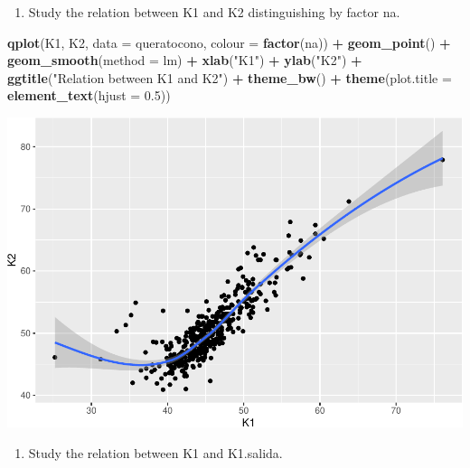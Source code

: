 \documentclass[
]{article}
\newenvironment{Shaded}{\begin{snugshade}}{\end{snugshade}}
\newcommand{\DataTypeTok}[1]{\textcolor[rgb]{0.13,0.29,0.53}{#1}}
\newcommand{\FloatTok}[1]{\textcolor[rgb]{0.00,0.00,0.81}{#1}}
\newcommand{\KeywordTok}[1]{\textcolor[rgb]{0.13,0.29,0.53}{\textbf{#1}}}
\newcommand{\NormalTok}[1]{#1}
\newcommand{\OperatorTok}[1]{\textcolor[rgb]{0.81,0.36,0.00}{\textbf{#1}}}
\newcommand{\StringTok}[1]{\textcolor[rgb]{0.31,0.60,0.02}{#1}}
\providecommand{\tightlist}{%
  \setlength{\itemsep}{0pt}\setlength{\parskip}{0pt}}
\begin{document}
\begin{enumerate}
\def\labelenumi{\arabic{enumi}.}
\setcounter{enumi}{1}
\tightlist
\item
  Study the relation between K1 and K2 distinguishing by factor na.
\end{enumerate}

\begin{Shaded}
\begin{Highlighting}[]
\KeywordTok{qplot}\NormalTok{(K1, K2, }\DataTypeTok{data =}\NormalTok{ queratocono, }\DataTypeTok{colour =} \KeywordTok{factor}\NormalTok{(na)) }\OperatorTok{+}
\StringTok{  }\KeywordTok{geom_point}\NormalTok{() }\OperatorTok{+}
\StringTok{  }\KeywordTok{geom_smooth}\NormalTok{(}\DataTypeTok{method =}\NormalTok{ lm) }\OperatorTok{+}
\StringTok{  }\KeywordTok{xlab}\NormalTok{(}\StringTok{"K1"}\NormalTok{) }\OperatorTok{+}\StringTok{ }\KeywordTok{ylab}\NormalTok{(}\StringTok{"K2"}\NormalTok{) }\OperatorTok{+}
\StringTok{  }\KeywordTok{ggtitle}\NormalTok{(}\StringTok{"Relation between K1 and K2"}\NormalTok{) }\OperatorTok{+}
\StringTok{  }\KeywordTok{theme_bw}\NormalTok{() }\OperatorTok{+}
\StringTok{  }\KeywordTok{theme}\NormalTok{(}\DataTypeTok{plot.title =} \KeywordTok{element_text}\NormalTok{(}\DataTypeTok{hjust =} \FloatTok{0.5}\NormalTok{))}
\end{Highlighting}
\end{Shaded}

\includegraphics{document_files/figure-latex/unnamed-chunk-3-1.pdf}

\begin{enumerate}
\def\labelenumi{\arabic{enumi}.}
\setcounter{enumi}{2}
\tightlist
\item
  Study the relation between K1 and K1.salida.
\end{enumerate}
\end{document}
